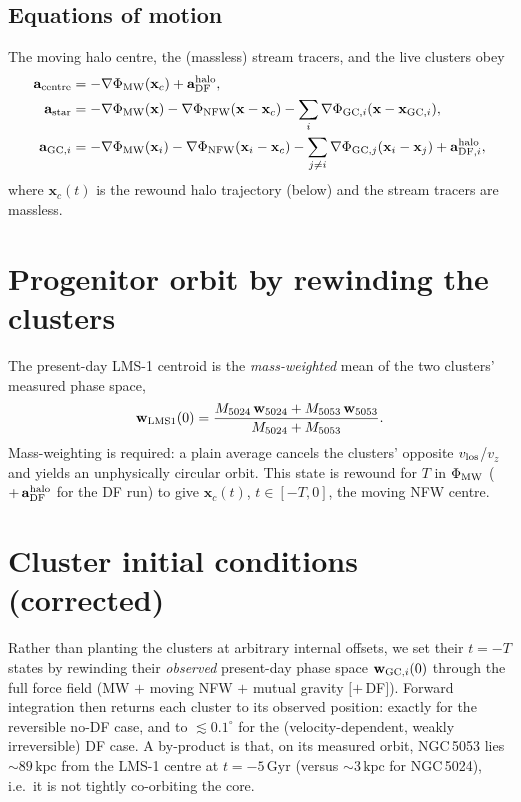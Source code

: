 \documentclass[11pt]{article}
\newcommand{\kpc}{\,\mathrm{kpc}}
\newcommand{\Gyr}{\,\mathrm{Gyr}}
\begin{document}
\subsection{Equations of motion}
The moving halo centre, the (massless) stream tracers, and the live clusters obey
\begin{align}
\mathbf{a}_{\rm centre} &= -\nabla\Phi_{\rm MW}(\mathbf{x}_c)
   + \mathbf{a}_{\rm DF}^{\rm halo},\\
\mathbf{a}_{\rm star} &= -\nabla\Phi_{\rm MW}(\mathbf{x})
   - \nabla\Phi_{\rm NFW}(\mathbf{x}-\mathbf{x}_c)
   - \sum_{i}\nabla\Phi_{{\rm GC},i}(\mathbf{x}-\mathbf{x}_{{\rm GC},i}),\\
\mathbf{a}_{{\rm GC},i} &= -\nabla\Phi_{\rm MW}(\mathbf{x}_i)
   - \nabla\Phi_{\rm NFW}(\mathbf{x}_i-\mathbf{x}_c)
   - \sum_{j\neq i}\nabla\Phi_{{\rm GC},j}(\mathbf{x}_i-\mathbf{x}_j)
   + \mathbf{a}_{{\rm DF},i}^{\rm halo},
\end{align}
where $\mathbf{x}_c(t)$ is the rewound halo trajectory (below) and the stream
tracers are massless.

\section{Progenitor orbit by rewinding the clusters}
The present-day LMS-1 centroid is the \emph{mass-weighted} mean of the two
clusters' measured phase space,
\begin{equation}
\mathbf{w}_{\rm LMS1}(0)=\frac{M_{5024}\,\mathbf{w}_{5024}+M_{5053}\,\mathbf{w}_{5053}}
{M_{5024}+M_{5053}}.
\end{equation}
Mass-weighting is required: a plain average cancels the clusters' opposite
$v_{\rm los}$/$v_z$ and yields an unphysically circular orbit. This state is
rewound for $T$ in $\Phi_{\rm MW}$ ($+\,\mathbf{a}_{\rm DF}^{\rm halo}$ for the DF
run) to give $\mathbf{x}_c(t)$, $t\in[-T,0]$, the moving NFW centre.

\section{Cluster initial conditions (corrected)}
\label{sec:gcic}
Rather than planting the clusters at arbitrary internal offsets, we set their
$t=-T$ states by rewinding their \emph{observed} present-day phase space
$\mathbf{w}_{{\rm GC},i}(0)$ through the full force field (MW $+$ moving NFW $+$
mutual gravity $[+\,$DF$]$). Forward integration then returns each cluster to its
observed position: exactly for the reversible no-DF case, and to
$\lesssim0.1^\circ$ for the (velocity-dependent, weakly irreversible) DF case.
A by-product is that, on its measured orbit, NGC\,5053 lies $\sim89\kpc$
from the LMS-1 centre at $t=-5\Gyr$ (versus $\sim3\kpc$ for NGC\,5024), i.e.\ it
is not tightly co-orbiting the core.
\end{document}
